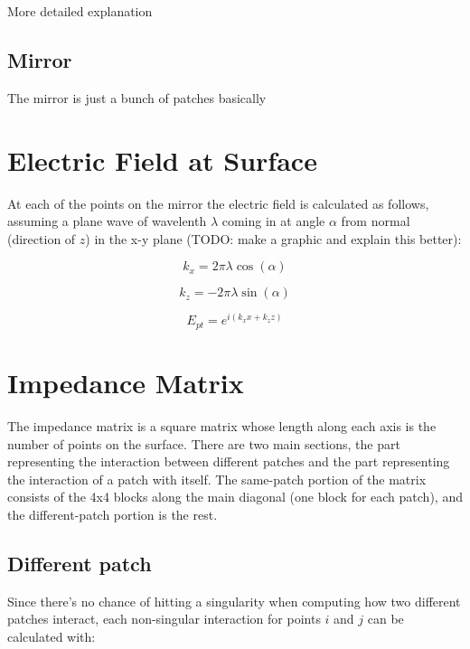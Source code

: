 \documentclass[etd,twoside,senior]{BYUPhys}
\begin{document}
More detailed explanation

\subsection{Mirror} \label{sec:mirror}

The mirror is just a bunch of patches basically



\section{Electric Field at Surface}\label{chap:efield}

At each of the points on the mirror the electric field is calculated as follows, assuming a plane wave of wavelenth $\lambda$ coming in at angle $\alpha$ from normal (direction of $z$) in the x-y plane (TODO: make a graphic and explain this better):

\begin{equation}
  k_{x}=2\pi\lambda\cos\left(\alpha\right)
\end{equation}

\begin{equation}
  k_{z}=-2\pi\lambda\sin\left(\alpha\right)
\end{equation}

\begin{equation}
  E_{pt}=e^{i\left(k_{x}x+k_{z}z\right)}
\end{equation}



\section{Impedance Matrix} \label{sec:impedance}

The impedance matrix is a square matrix whose length along each axis is the number of points on the surface. There are two main sections, the part representing the interaction between different patches and the part representing the interaction of a patch with itself. The same-patch portion of the matrix consists of the 4x4 blocks along the main diagonal (one block for each patch), and the different-patch portion is the rest.

\subsection{Different patch} \label{sec:different_patch}

Since there's no chance of hitting a singularity when computing how two different patches interact, each non-singular interaction for points $i$ and $j$ can be calculated with:
\end{document}
